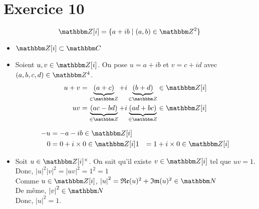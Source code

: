 \part{Exercice 10}

\[
	\Z[i] = \{a+ib  \mid (a,b) \in \Z^2\} 
\]

\begin{itemize}
	\item $\Z[i] \subset  \C$ 
	\item Soient $u,v \in \Z[i]$. On pose $u = a + ib$ et $v = c+id$ avec $(a,b,c,d) \in \Z^4$.\\
		\begin{align*}
			u+v &= \underbrace{(a+c)}_{\in \Z} + i\underbrace{(b+d)}_{\in \Z} \in \Z[i]\\
			uv &= \underbrace{(ac-bd)}_{\in \Z} + i\underbrace{(ad+bc)}_{\in \Z} \in \Z[i]\\
		\end{align*}

		\begin{align*}
			- u &= -a - ib  \in \Z[i]\\
			0 &= 0 + i \times 0 \in \Z[i]
			1 &= 1 + i \times 0 \in \Z[i]
		\end{align*}
	\item Soit $u \in \Z[i]^\times$. On sait qu'il existe $v \in \Z[i]$ tel que $uv = 1$.\\
		Donc, $\left| u \right|^2\left| v \right| ^2 = \left| uv \right| ^2 = 1^2=1$ \\
		Comme $u \in \Z[i]$, $\left| u \right| ^2 = \Re(u)^2 + \Im(u)^2 \in \N$ \\
		De même, $\left| v \right| ^2 \in \N$ \\
		Donc, $\left| u \right| ^2 = 1$.



\end{itemize}
